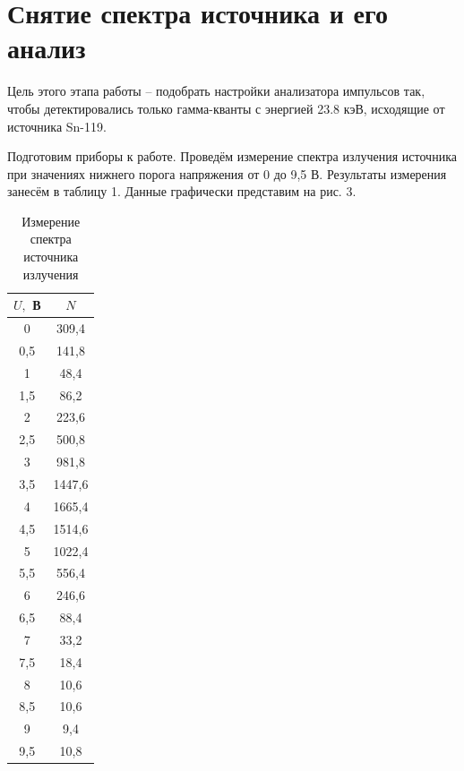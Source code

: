 \documentclass[a4paper, 12pt]{article}
\begin{document}
\section{Снятие спектра источника и его анализ}
Цель этого этапа работы -- подобрать настройки анализатора импульсов так, чтобы детектировались только гамма-кванты с энергией 23.8 кэВ, исходящие от источника Sn-119.

Подготовим приборы к работе. Проведём измерение спектра излучения источника при значениях нижнего порога напряжения от 0 до 9,5 В. Результаты измерения занесём в таблицу 1. Данные графически представим на рис. 3.

\begin{table}[h!]
\begin{tabular}{|c|c|}
\hline
$U, $ В & $N$    \\ \hline
0       & 309,4  \\ \hline
0,5     & 141,8  \\ \hline
1       & 48,4   \\ \hline
1,5     & 86,2   \\ \hline
2       & 223,6  \\ \hline
2,5     & 500,8  \\ \hline
3       & 981,8  \\ \hline
3,5     & 1447,6 \\ \hline
4       & 1665,4 \\ \hline
4,5     & 1514,6 \\ \hline
5       & 1022,4 \\ \hline
5,5     & 556,4  \\ \hline
6       & 246,6  \\ \hline
6,5     & 88,4   \\ \hline
7       & 33,2   \\ \hline
7,5     & 18,4   \\ \hline
8       & 10,6   \\ \hline
8,5     & 10,6   \\ \hline
9       & 9,4    \\ \hline
9,5     & 10,8   \\ \hline
\end{tabular}
\centering
\caption{Измерение спектра источника излучения}
\end{table}
\end{document}

